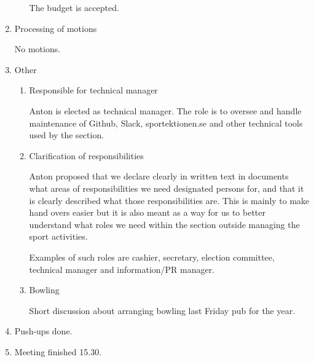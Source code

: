 \documentclass[12pt,a4paper]{article}
\begin{document}
\begin{enumerate}
\begin{itemize}
					The budget is accepted.
			\end{itemize}
		\item Processing of motions
		
			No motions.
			
		\item Other
			\begin{enumerate}
				\item Responsible for technical manager
				
					Anton is elected as technical manager. The role is to oversee and handle maintenance of Github, Slack, sportektionen.se and other technical tools used by the section.
					
				\item Clarification of responsibilities
				
					Anton proposed that we declare clearly in written text in documents what areas of responsibilities we need designated persons for, and that it is clearly described what those responsibilities are. This is mainly to make hand overs easier but it is also meant as a way for us to better understand what roles we need within the section outside managing the sport activities.
					
					Examples of such roles are cashier, secretary, election committee, technical manager and information/PR manager.
					
				\item Bowling

					Short discussion about arranging bowling last Friday pub for the year.
					
			\end{enumerate}
		\item Push-ups done.
		\item Meeting finished 15.30.
	\end{enumerate}
\end{document}
